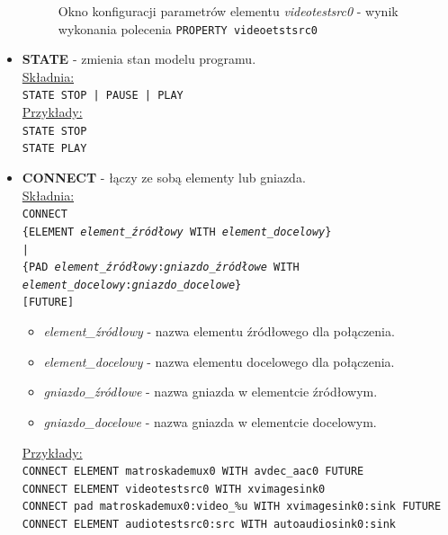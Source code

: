 \documentclass[12pt]{article}
\begin{document}
\begin{itemize}
\begin{figure}[H]
  \caption{Okno konfiguracji parametrów elementu \textit{videotestsrc0} - wynik wykonania polecenia \texttt{PROPERTY videoetstsrc0}}
  \label{fig:allPropertiesWindow}
\end{figure}
\cleardoublepage
\item \textbf{STATE} - zmienia stan modelu programu. \\
\underline{Składnia:} \\
\texttt{STATE STOP | PAUSE | PLAY} \\
\underline{Przykłady:} \\
\texttt{STATE STOP} \\
\texttt{STATE PLAY}
\item \textbf{CONNECT} - łączy ze sobą elementy lub gniazda. \\
\underline{Składnia:} \\
\texttt{CONNECT \\
\hspace*{2em} \{ELEMENT \textit{element\_źródłowy} WITH \textit{element\_docelowy}\} \\
\hspace*{2em} | \\
\hspace*{2em} \{PAD \textit{element\_źródłowy}:\textit{gniazdo\_źródłowe} WITH \\
\hspace*{4em} \textit{element\_docelowy}:\textit{gniazdo\_docelowe}\} \\
\hspace*{2em} [FUTURE]}
\begin{itemize}
\item \textit{element\_źródłowy} - nazwa elementu źródłowego dla połączenia.
\item \textit{element\_docelowy} - nazwa elementu docelowego dla połączenia.
\item \textit{gniazdo\_źródłowe} - nazwa gniazda w elementcie źródłowym.
\item \textit{gniazdo\_docelowe} - nazwa gniazda w elementcie docelowym.
\end{itemize}
\underline{Przykłady:} \\
\texttt{CONNECT ELEMENT matroskademux0 WITH avdec\_aac0 FUTURE} \\
\texttt{CONNECT ELEMENT videotestsrc0 WITH xvimagesink0} \\
\texttt{CONNECT pad matroskademux0:video\_\%u WITH xvimagesink0:sink FUTURE}
\texttt{CONNECT ELEMENT audiotestsrc0:src WITH autoaudiosink0:sink} \\

\end{itemize}
\end{document}
